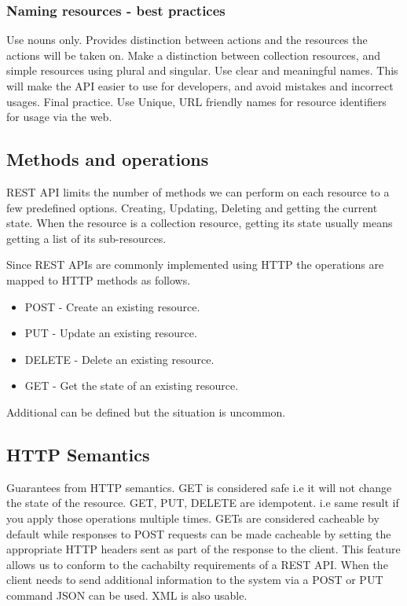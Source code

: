 \documentclass[a4paper, 11pt]{book}
\begin{document}
    \subsubsection{Naming resources - best practices}
    Use nouns only.
    Provides distinction between actions and the resources the actions will be taken on.
    Make a distinction between collection resources, and simple resources using plural and singular.
    Use clear and meaningful names.
    This will make the API easier to use for developers, and avoid mistakes and incorrect usages.
    Final practice.
    Use Unique, URL friendly names for resource identifiers for usage via the web.

    \subsection{Methods and operations}
    REST API limits the number of methods we can perform on each resource to a few predefined options.
    Creating, Updating, Deleting and getting the current state.
    When the resource is a collection resource, getting its state usually means getting a list of its sub-resources.

    Since REST APIs are commonly implemented using HTTP the operations are mapped to HTTP methods as follows.

    \begin{itemize}
        \item POST - Create an existing resource.
        \item PUT - Update an existing resource.
        \item DELETE - Delete an existing resource.
        \item GET - Get the state of an existing resource.
    \end{itemize}

    Additional can be defined but the situation is uncommon.

    \subsection{HTTP Semantics}
    Guarantees from HTTP semantics.
    GET is considered safe i.e it will not change the state of the resource.
    GET, PUT, DELETE are idempotent.
    i.e same result if you apply those operations multiple times.
    GETs are considered cacheable by default while responses to POST requests can be made cacheable by setting the appropriate HTTP headers sent as part of the response to the client.
    This feature allows us to conform to the cachabilty requirements of a REST API.
    When the client needs to send additional information to the system via a POST or PUT command JSON can be used.
    XML is also usable.
\end{document}
